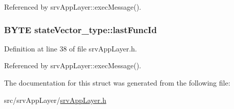 Referenced by srvAppLayer::execMessage().

\hypertarget{structstateVector__type_acb4d13284c9926c9be57f7197ec3f803}{
\subsubsection[{lastFuncId}]{\setlength{\rightskip}{0pt plus 5cm}BYTE {\bf stateVector\_\-type::lastFuncId}}}
\label{d8/db4/structstateVector__type_acb4d13284c9926c9be57f7197ec3f803}


Definition at line 38 of file srvAppLayer.h.



Referenced by srvAppLayer::execMessage().



The documentation for this struct was generated from the following file:\begin{DoxyCompactItemize}
\item 
src/srvAppLayer/\hyperlink{srvAppLayer_8h}{srvAppLayer.h}\end{DoxyCompactItemize}
